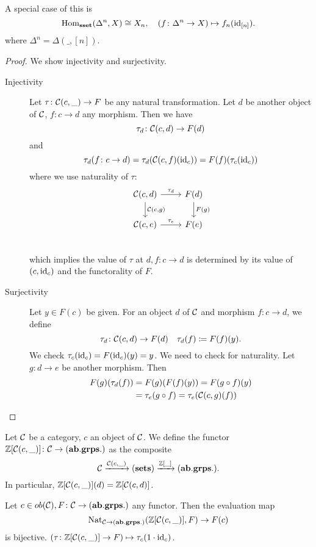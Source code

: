 \documentclass[language=english]{TemplateLecture}
\begin{document}
\begin{Remark}
    A special case of this is
    \[\operatorname{Hom}_{\mathbf{sset}}(\Delta^n, X) \cong X_n, \quad (f\colon \Delta
    ^n\to X) \mapsto f_n(\operatorname{id}_{[n]}).\]
    where \(\Delta^n = \Delta(\_, [n])\).
\end{Remark}

\begin{proof}
    We show injectivity and surjectivity.
    \begin{description}
        \item[Injectivity] Let \(\tau\colon \mathcal{C}(c,\_) \to F\) be any natural transformation. Let \(d\) be another object of \(\mathcal{C}\), \(f\colon c\to d\) any morphism. Then we have
        \[\tau_d\colon \mathcal{C}(c,d) \to F(d)\]
        and
        \[\tau_d(f\colon c \to d) = \tau_d(\mathcal{C}(c,f)(\operatorname{id}_c)) = F(f) (\tau_c(\operatorname{id}_c))\]
        where we use naturality of \(\tau\):
        \[\begin{tikzcd}
            {\cC(c,d)} \ar[r, "\tau_d"] \ar[d, "{\cC(c,g)}"] & F(d) \ar[d, "F(g)"] \\
            {\cC(c,e)} \ar[r, "\tau_e"] & F(e) \\
        \end{tikzcd}\]
        which implies the value of \(\tau\) at \(d,f\colon c\to d\) is determined by its value of \((c, \operatorname{id}_c)\) and the functorality of \(F\).
        \item[Surjectivity] Let \(y \in F(c)\) be given. For an object \(d\) of \(\mathcal{C}\) and morphism \(f\colon c \to d\), we define
        \[\tau_d\colon \mathcal{C}(c,d) \to F(d) \quad \tau_d(f) \coloneq F(f)(y).\]
        We check \(\tau_c(\operatorname{id}_c) = F(\operatorname{id}_c)(y) = y\).
        We need to check for naturality. Let \(g\colon d \to e \) be another morphism. Then
        \[\begin{split}
            F(g)(\tau_d(f)) &= F(g)(F(f)(y)) = F(g\circ f)(y) \\
            &= \tau_e(g\circ f) = \tau_e(\mathcal{C}(c,g)(f)) \\
        \end{split}\]
        \end{description}
\end{proof}

Let \(\mathcal{C}\) be a category, \(c\) an object of \(\mathcal{C}\). We define the functor \(\mathbb{Z}[\mathcal{C}(c,\_)]\colon \mathcal{C} \to (\mathbf{ab.grps.})\) as the composite
\[\mathcal{C} \xrightarrow{\mathcal{C}(c,\_)} (\mathbf{sets}) \xrightarrow{\mathbb{Z}[\_]} (\mathbf{ab.grps.}).\]
In particular, \(\mathbb{Z}[\mathcal{C}(c, \_)] (d) = \mathbb{Z}[\mathcal{C}(c,d)]\).
\begin{Proposition}
    Let \(c \in ob(\mathcal{C}), F\colon \mathcal{C} \to (\mathbf{ab.grps.})\) any functor. Then the evaluation map
    \[\mathrm{Nat}_{\mathcal{C} \to (\mathbf{ab.grps.})}(\mathbb{Z}[\mathcal{C}(c,\_)], F) \to F(c)\]
    is bijective. \((\tau\colon \mathbb{Z}[\mathcal{C}(c, \_)] \to F) \mapsto \tau_c(1\cdot \operatorname{id}_c)\).
\end{Proposition}
\end{document}

